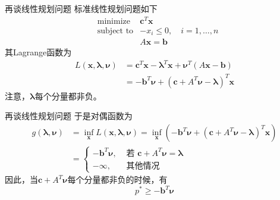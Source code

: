 
\begin{frame}

\begin{block}{再谈线性规划问题}
标准线性规划问题如下
\begin{eqnarray*}
& \text{minimize} & \mathbf{c}^T\mathbf{x} \\
& \text{subject to} & -x_i \le 0, \quad i = 1,\ldots,n \\
& & A\mathbf{x} = \mathbf{b}
\end{eqnarray*}
其Lagrange函数为
\begin{align*}
L(\mathbf{x}, \boldsymbol\lambda, \boldsymbol\nu) & = \mathbf{c}^T\mathbf{x} - \boldsymbol\lambda^T \mathbf{x} + \boldsymbol\nu^T(A\mathbf{x} - \mathbf{b}) \\
& = -\mathbf{b}^T \boldsymbol\nu + (\mathbf{c} + A^T \boldsymbol\nu - \boldsymbol\lambda)^T \mathbf{x}
\end{align*}
注意，$\boldsymbol\lambda$每个分量都非负。
\end{block}

\end{frame}


\begin{frame}

\begin{block}{再谈线性规划问题}
于是对偶函数为
\begin{align*}
g(\boldsymbol\lambda, \boldsymbol\nu) & = \inf\limits_{\mathbf{x}} L(\mathbf{x}, \boldsymbol\lambda, \boldsymbol\nu) = \inf\limits_{\mathbf{x}} (-\mathbf{b}^T \boldsymbol\nu + (\mathbf{c} + A^T \boldsymbol\nu - \boldsymbol\lambda)^T \mathbf{x}) \\
& = \begin{cases}
-\mathbf{b}^T \boldsymbol\nu, & \text{ 若 } \mathbf{c} + A^T \boldsymbol\nu = \boldsymbol\lambda \\
-\infty, & \text{ 其他情况 }
\end{cases}
\end{align*}
因此，当$\mathbf{c} + A^T \boldsymbol\nu$每个分量都非负的时候，有
$$p^* \ge -\mathbf{b}^T \boldsymbol\nu$$
\end{block}

\end{frame}


